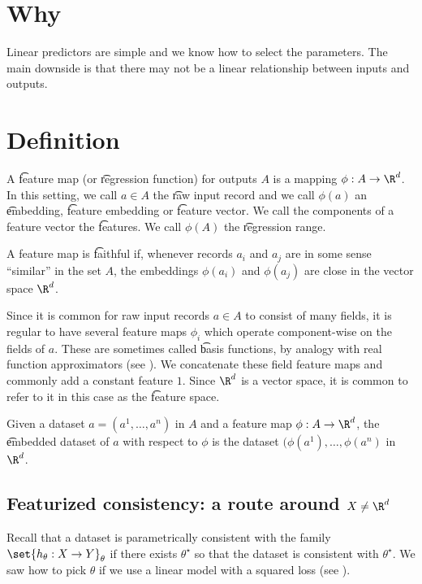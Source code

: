 
\section*{Why}

Linear predictors are simple and we know how to select the parameters.
The main downside is that there may not be a linear relationship between inputs and outputs.

\section*{Definition}

A \t{feature map} (or \t{regression function}) for outputs $A$ is a mapping $\phi : A \to \R ^d$.
In this setting, we call $a \in A$ the \t{raw input record} and we call $\phi (a)$ an \t{embedding}, \t{feature embedding} or \t{feature vector}.
We call the components of a feature vector the \t{features}.
We call $\phi (A)$ the \t{regression range}.

A feature map is \t{faithful} if, whenever records $a_i$ and $a_j$ are in some sense ``similar'' in the set $A$, the embeddings $\phi (a_i)$ and $\phi (a_j)$ are close in the vector space $\R ^d$.

Since it is common for raw input records $a \in A$ to consist of many fields, it is regular to have several feature maps $\phi _i$ which operate component-wise on the fields of $a$.
These are sometimes called \t{basis functions}, by analogy with real function approximators (see ).
We concatenate these field feature maps and commonly add a constant feature $1$.
Since $\R ^d$ is a vector space, it is common to refer to it in this case as the \t{feature space}.

Given a dataset $a = (a^1, \dots , a^n)$ in $A$ and a feature map $\phi : A \to \R ^d$, the \t{embedded dataset} of $a$ with respect to $\phi $ is the dataset $(\phi (a^1), \dots , \phi (a^n)$ in $\R ^d$.

\subsection*{Featurized consistency: a route around $X \neq \R ^d$}

Recall that a dataset is parametrically consistent with the family $\set{h_{\theta }: X \to Y}_{\theta }$ if there exists $\theta ^\star$ so that the dataset is consistent with $\theta ^{\star}$.
We saw how to pick $\theta $ if we use a linear model with a squared loss (see ).

